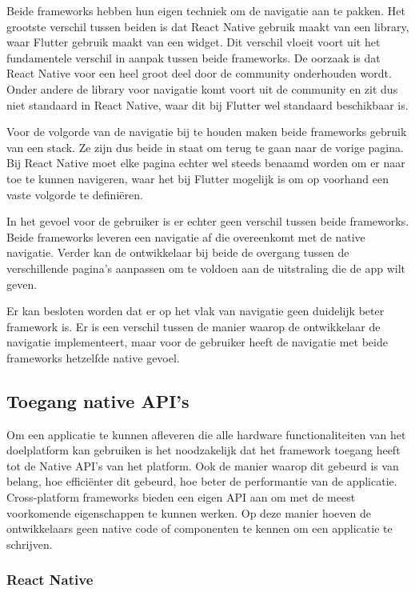 Beide frameworks hebben hun eigen techniek om de navigatie aan te pakken. Het
grootste verschil tussen beiden is dat React Native gebruik maakt van een
library, waar Flutter gebruik maakt van een widget. Dit verschil vloeit voort
uit het fundamentele verschil in aanpak tussen beide frameworks. De oorzaak is
dat React Native voor een heel groot deel door de community onderhouden wordt.
Onder andere de library voor navigatie komt voort uit de community en zit dus
niet standaard in React Native, waar dit bij Flutter wel standaard beschikbaar
is.

Voor de volgorde van de navigatie bij te houden maken beide frameworks gebruik
van een stack. Ze zijn dus beide in staat om terug te gaan naar de vorige
pagina. Bij React Native moet elke pagina echter wel steeds benaamd worden om er
naar toe te kunnen navigeren, waar het bij Flutter mogelijk is om op voorhand
een vaste volgorde te definiëren.

In het gevoel voor de gebruiker is er echter geen verschil tussen beide
frameworks. Beide frameworks leveren een navigatie af die overeenkomt met de
native navigatie. Verder kan de ontwikkelaar bij beide de overgang tussen de
verschillende pagina's aanpassen om te voldoen aan de uitstraling die de app
wilt geven. 

Er kan besloten worden dat er op het vlak van navigatie geen duidelijk beter
framework is. Er is een verschil tussen de manier waarop de ontwikkelaar de
navigatie implementeert, maar voor de gebruiker heeft de navigatie met beide
frameworks hetzelfde native gevoel.

\subsection{Toegang native API's}
\label{subsec:toegangNativeAPIs}

Om een applicatie te kunnen afleveren die alle hardware functionaliteiten van
het doelplatform kan gebruiken is het noodzakelijk dat het framework toegang
heeft tot de Native API's van het platform. Ook de manier waarop dit gebeurd is
van belang, hoe efficiënter dit gebeurd, hoe beter de performantie van de
applicatie. Cross-platform frameworks bieden een eigen API aan om met de meest
voorkomende eigenschappen te kunnen werken. Op deze manier hoeven de
ontwikkelaars geen native code of componenten te kennen om een applicatie te
schrijven.

\subsubsection{React Native}
\label{subsubsec:nativeAPIReactNative}


